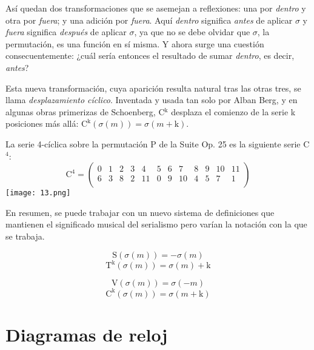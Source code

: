 		Así quedan dos transformaciones que se asemejan a reflexiones: una por \textit{dentro} y otra por \textit{fuera}; y una adición por \textit{fuera}. Aquí \textit{dentro} significa \textit{antes} de aplicar $\sigma$ y \textit{fuera} significa \textit{después} de aplicar $\sigma$, ya que no se debe olvidar que $\sigma$, la permutación, es una función en sí misma. Y ahora surge una cuestión consecuentemente: ¿cuál sería entonces el resultado de sumar \textit{dentro}, es decir, \textit{antes}?
		
		Esta nueva transformación, cuya aparición resulta natural tras las otras tres, se llama \textit{desplazamiento cíclico}. Inventada y usada tan solo por Alban Berg, y en algunas obras primerizas de Schoenberg, C$^\text{k}$ desplaza el comienzo de la serie k posiciones más allá: $\text{C}^\text{k}\left(\sigma\left(m\right)\right)=\sigma\left(m+\text{k}\right)$.
		
		
		La serie 4-cíclica sobre la permutación P de la Suite Op. 25 es la siguiente serie C$^4$:	
		\[\text{C}^4=\left(\begin{matrix}0&1&2&3&4&5&6&7&8&9&10&11\\6&3&8&2&11&0&9&10&4&5&7&1\\\end{matrix}\right)\]		
		\texttt{[image: 13.png]}
		
		En resumen, se puede trabajar con un nuevo sistema de definiciones que mantienen el significado musical del serialismo pero varían la notación con la que se trabaja. 
		\vspace{-\bigskipamount}
		\begin{multicols}{2}
		\[\text{S}(\sigma(m)) = -\sigma(m)\]
		\[\text{T}^\text{k}(\sigma(m)) = \sigma(m) + \text{k}\]
		
		\[\text{V}(\sigma(m)) = \sigma(-m)\]
		\[\text{C}^\text{k}(\sigma(m))=\sigma(m+\text{k})\]
		\end{multicols}
	
	\section{Diagramas de reloj}
	\label{diagramas}
	
